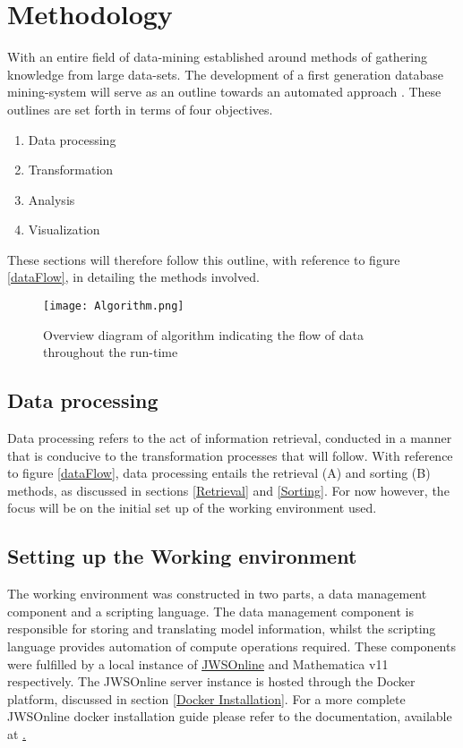 \chapter{Methodology} \label{chp:3}
With an entire field of data-mining established around methods of gathering knowledge from large data-sets. The development of a first generation database mining-system will serve as an outline towards an automated approach \cite{Imielinski1996, Radivojac2004, Uppalaiah2012}. These outlines are set forth in terms of four objectives.

\begin{enumerate}
\item Data processing
\item Transformation
\item Analysis
\item Visualization
\end{enumerate} 

These sections will therefore follow this outline, with reference to figure \ref{dataFlow}, in detailing the methods involved.

\begin{figure}[h] \label{dataFlow}
\texttt{[image: Algorithm.png]}
\centering
\caption{Overview diagram of algorithm indicating the flow of data throughout the run-time}
\label{fig:Algorithm}
\end{figure}

\section{Data processing} \label{Data processing}
Data processing refers to the act of information retrieval, conducted in a manner that is conducive to the transformation processes that will follow. With reference to figure \ref{dataFlow}, data processing entails the retrieval (A) and sorting (B) methods, as discussed in sections \ref{Retrieval} and \ref{Sorting}. For now however, the focus will be on the initial set up of the working environment used.

\section{Setting up the Working environment} \label{Working Environment}
The working environment was constructed in two parts, a data management component and a scripting language. The data management component is responsible for storing and translating model information, whilst the scripting language provides automation of compute operations required. These components were fulfilled by a local instance of \href{https://jjj.bio.vu.nl}{JWSOnline} and Mathematica v11 respectively. The JWSOnline server instance is hosted through the Docker platform, discussed in section \ref{Docker Installation}. For a more complete JWSOnline docker installation guide please refer to the documentation, available at \href{http://jws-docs.readthedocs.io/10_docker.html#building-the-jws-online-docker-image}.


